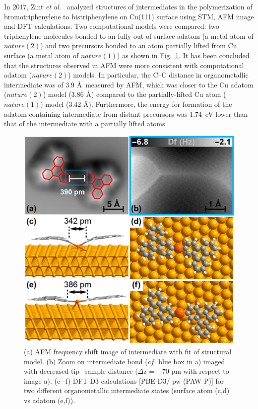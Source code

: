 \documentclass[%
 reprint,
 amsmath,amssymb,
 aps,
prb,
]{revtex4-2}
\begin{document}
In 2017, Zint \textit{et al.}~\cite{acsnano2017} analyzed structures of intermediates in the polymerization of bromotriphenylene to bistriphenylene on Cu(111) surface using STM, AFM image and DFT calculations. Two computational models were compared: two triphenylene molecules bonded to an fully-out-of-surface adatom (a metal atom of $nature(2)$) and two precursors bonded to an atom partially lifted from Cu surface (a metal atom of $nature(1)$) as shown in Fig.~\ref{fig:5}. It has been concluded that the structures observed in AFM were more consistent with computational adatom ($nature(2)$) models. In particular, the C--C distance in organometallic intermediate was of 3.9 \AA\ measured by AFM, which was closer to the Cu adatom ($nature(2)$) model (3.86 \AA) compared to the partially-lifted Cu atom ($nature(1)$) model (3.42 \AA). Furthermore, the energy for formation of the adatom-containing intermediate from distant precursors was 1.74~eV lower than that of the intermediate with a partially lifted atoms. 
\begin{figure}[hbt]
\centering
\includegraphics[width=0.75\columnwidth]{Fig/distance.png}
\caption{(a) AFM frequency shift image of intermediate with fit of structural model. (b) Zoom on intermediate bond ($cf$. blue box in a) imaged with decreased tip−sample distance ($\Delta$z = −70 pm with respect to image a). (c−f) DFT-D3 calculations [PBE-D3/ pw (PAW P)] for two different organometallic intermediate states (surface atom (c,d) vs adatom (e,f)).}
\label{fig:5}
\end{figure}
\end{document}
